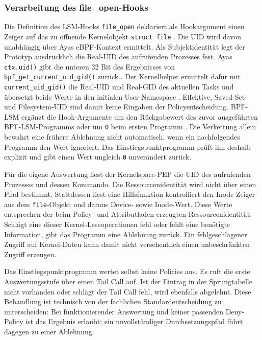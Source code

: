 \subsubsection{Verarbeitung des file\_open-Hooks}
Die Definition des LSM-Hooks \texttt{file\_open} deklariert als Hookargument einen Zeiger auf das zu öffnende Kernelobjekt \texttt{struct file} \citep{linuxLsmHookDefs}.
Die UID wird davon unabhängig über Ayas eBPF-Kontext ermittelt.
Als Subjektidentität legt der Prototyp ausdrücklich die Real-UID des aufrufenden Prozesses fest.
Ayas \texttt{ctx.uid()} gibt die unteren 32 Bit des Ergebnisses von \texttt{bpf\_get\_current\_uid\_gid()} zurück \citep{ayaEbpfContextSource}.
Der Kernelhelper ermittelt dafür mit \texttt{current\_uid\_gid()} die Real-UID und Real-GID des aktuellen Tasks und übersetzt beide Werte in den initialen User-Namespace \citep{kernelBpfHelpersSource,kernelCredentials}.
Effektive, Saved-Set- und Filesystem-UID sind damit keine Eingaben der Policyentscheidung. BPF-LSM ergänzt die Hook-Argumente um den Rückgabewert des zuvor ausgeführten BPF-LSM-Programms oder um \texttt{0} beim ersten Programm \citep{kernelBpfLsm}. Die Verkettung allein bewahrt eine frühere Ablehnung nicht automatisch, wenn ein nachfolgendes Programm den Wert ignoriert. Das Einstiegspunktprogramm prüft ihn deshalb explizit und gibt einen Wert ungleich \texttt{0} unverändert zurück.

Für die eigene Auswertung liest der Kernelspace-PEP die UID des aufrufenden Prozesses und dessen Kommando. Die Ressourcenidentität wird nicht über einen Pfad bestimmt. Stattdessen liest eine Hilfsfunktion kontrolliert den Inode-Zeiger aus dem \texttt{file}-Objekt und daraus Device- sowie Inode-Wert. Diese Werte entsprechen der beim Policy- und Attributladen erzeugten Ressourcenidentität. Schlägt eine dieser Kernel-Leseoperationen fehl oder fehlt eine benötigte Information, gibt das Programm eine Ablehnung zurück. Ein fehlgeschlagener Zugriff auf Kernel-Daten kann damit nicht versehentlich einen unbeschränkten Zugriff erzeugen.

Das Einstiegspunktprogramm wertet selbst keine Policies aus. Es ruft die erste Auswertungsstufe über einen Tail Call auf. Ist der Eintrag in der Sprungtabelle nicht vorhanden oder schlägt der Tail Call fehl, wird ebenfalls abgelehnt. Diese Behandlung ist technisch von der fachlichen Standardentscheidung zu unterscheiden: Bei funktionierender Auswertung und keiner passenden Deny-Policy ist das Ergebnis erlaubt; ein unvollständiger Durchsetzungspfad führt dagegen zu einer Ablehnung.

